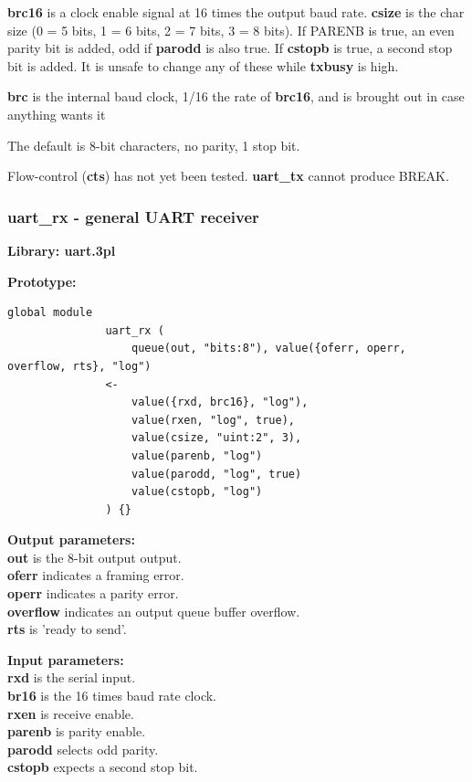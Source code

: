             {\bf brc16} is a clock enable signal at 16 times the output baud
            rate. {\bf csize} is the char size (0 = 5 bits, 1 = 6 bits, 2 = 7
            bits, 3 = 8 bits). If PARENB is true, an even parity bit is added,
            odd if {\bf parodd} is also true. If {\bf cstopb} is true, a second
            stop bit is added. It is unsafe to change any of these while {\bf
            txbusy} is high.

            {\bf brc} is the internal baud clock, 1/16 the rate of {\bf brc16},
            and is brought out in case anything wants it

            The default is 8-bit characters, no parity, 1 stop bit.

            Flow-control ({\bf cts}) has not yet been tested.
            {\bf uart\_tx} cannot produce BREAK.


        \subsubsection{uart\_rx - general UART receiver}\label{sec:lmuartrx}

            {\bf Library: uart.3pl}

            {\bf Prototype:} \\
            \vsp
            \begin{lstlisting}[gobble=12, language=threepl]
               global module
               uart_rx (
                   queue(out, "bits:8"), value({oferr, operr, overflow, rts}, "log")
               <-
                   value({rxd, brc16}, "log"),
                   value(rxen, "log", true),
                   value(csize, "uint:2", 3),
                   value(parenb, "log")
                   value(parodd, "log", true)
                   value(cstopb, "log")
               ) {}
            \end{lstlisting}

            {\bf Output parameters:} \\
            {\bf out} is the 8-bit output output.\\
            {\bf oferr} indicates a framing error.\\
            {\bf operr} indicates a parity error.\\
            {\bf overflow} indicates an output queue buffer overflow.\\
            {\bf rts} is 'ready to send'.

            {\bf Input parameters:} \\
            {\bf rxd} is the serial input.\\
            {\bf br16} is the 16 times baud rate clock.\\
            {\bf rxen} is receive enable.\\
            {\bf parenb} is parity enable.\\
            {\bf parodd} selects odd parity.\\
            {\bf cstopb} expects a second stop bit.

